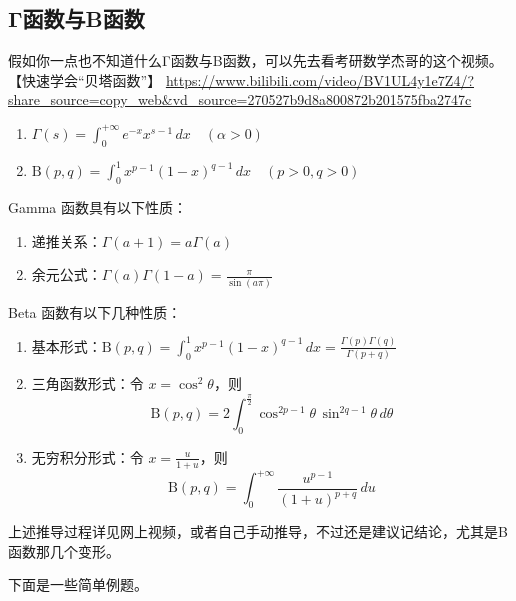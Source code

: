 \subsection{Γ函数与B函数}
假如你一点也不知道什么Γ函数与B函数，可以先去看考研数学杰哥的这个视频。【快速学会“贝塔函数”】 \url{https://www.bilibili.com/video/BV1UL4y1e7Z4/?share_source=copy_web&vd_source=270527b9d8a800872b201575fba2747c}
\begin{theorem}[Γ函数与B函数基本形式]
    \begin{enumerate}
      \item $ \displaystyle \Gamma(s) = \int_{0}^{+\infty} e^{-x} x^{s-1}\, dx \quad (\alpha > 0) $ 
      \item $ \displaystyle \mathrm{B}(p,q) = \int_{0}^{1} x^{p-1}(1-x)^{q-1} \,dx \quad (p>0,q>0) $
    \end{enumerate}
\end{theorem}   

\begin{lemma}
Gamma 函数具有以下性质：
\begin{enumerate}
    \item 递推关系：$\displaystyle \Gamma(a+1) = a\Gamma(a)$
    \item 余元公式：$\displaystyle \Gamma(a)\Gamma(1-a) = \frac{\pi}{\sin(a\pi)}$
\end{enumerate}
\end{lemma}

\begin{lemma}
Beta 函数有以下几种性质：
\begin{enumerate}
    \item 基本形式：$\displaystyle \mathrm{B}(p,q) = \int_{0}^{1} x^{p-1}(1-x)^{q-1} \,dx = \frac{\Gamma(p)\Gamma(q)}{\Gamma(p+q)}$
    
    \item 三角函数形式：令 $x = \cos^2\theta$，则
    \[
    \mathrm{B}(p,q) = 2\int_{0}^{\frac{\pi}{2}} \cos^{2p-1}\theta \, \sin^{2q-1}\theta \, d\theta
    \]
    
    \item 无穷积分形式：令 $x = \frac{u}{1+u}$，则
    \[
    \mathrm{B}(p,q) = \int_{0}^{+\infty} \frac{u^{p-1}}{(1+u)^{p+q}} \, du
    \]
\end{enumerate}
\end{lemma}
上述推导过程详见网上视频，或者自己手动推导，不过还是建议记结论，尤其是B函数那几个变形。

下面是一些简单例题。

